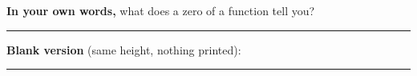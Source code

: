 \textbf{In your own words,} what does a zero of a function tell you?
\noindent\rule{\linewidth}{0.2pt}\par
\textbf{Blank version} (same height, nothing printed):
\writespace{1.6cm}{}
\noindent\rule{\linewidth}{0.2pt}
